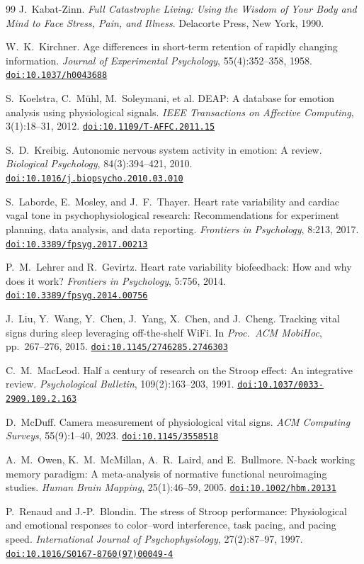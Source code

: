 \documentclass[11pt,a4paper]{article}
\newcommand{\doi}[1]{\href{https://doi.org/#1}{\nolinkurl{doi:#1}}}
\begin{document}
\begin{thebibliography}{99}
 J.~Kabat-Zinn. \emph{Full Catastrophe Living: Using the Wisdom of Your Body and Mind to Face
Stress, Pain, and Illness}. Delacorte Press, New York, 1990.

 W.~K.~Kirchner. Age differences in short-term retention of rapidly changing information.
\emph{Journal of Experimental Psychology}, 55(4):352--358, 1958. \doi{10.1037/h0043688}

 S.~Koelstra, C.~M\"uhl, M.~Soleymani, et al. DEAP: A database for emotion analysis using
physiological signals. \emph{IEEE Transactions on Affective Computing}, 3(1):18--31, 2012.
\doi{10.1109/T-AFFC.2011.15}

 S.~D.~Kreibig. Autonomic nervous system activity in emotion: A review. \emph{Biological
Psychology}, 84(3):394--421, 2010. \doi{10.1016/j.biopsycho.2010.03.010}

 S.~Laborde, E.~Mosley, and J.~F.~Thayer. Heart rate variability and cardiac vagal tone in
psychophysiological research: Recommendations for experiment planning, data analysis, and data reporting.
\emph{Frontiers in Psychology}, 8:213, 2017. \doi{10.3389/fpsyg.2017.00213}

 P.~M.~Lehrer and R.~Gevirtz. Heart rate variability biofeedback: How and why does it work?
\emph{Frontiers in Psychology}, 5:756, 2014. \doi{10.3389/fpsyg.2014.00756}

 J.~Liu, Y.~Wang, Y.~Chen, J.~Yang, X.~Chen, and J.~Cheng. Tracking vital signs during sleep
leveraging off-the-shelf WiFi. In \emph{Proc.\ ACM MobiHoc}, pp.~267--276, 2015. \doi{10.1145/2746285.2746303}

 C.~M.~MacLeod. Half a century of research on the Stroop effect: An integrative review.
\emph{Psychological Bulletin}, 109(2):163--203, 1991. \doi{10.1037/0033-2909.109.2.163}

 D.~McDuff. Camera measurement of physiological vital signs. \emph{ACM Computing Surveys},
55(9):1--40, 2023. \doi{10.1145/3558518}

 A.~M.~Owen, K.~M.~McMillan, A.~R.~Laird, and E.~Bullmore. N-back working memory paradigm: A
meta-analysis of normative functional neuroimaging studies. \emph{Human Brain Mapping}, 25(1):46--59, 2005.
\doi{10.1002/hbm.20131}

 P.~Renaud and J.-P.~Blondin. The stress of Stroop performance: Physiological and emotional
responses to color--word interference, task pacing, and pacing speed. \emph{International Journal of
Psychophysiology}, 27(2):87--97, 1997. \doi{10.1016/S0167-8760(97)00049-4}


\end{thebibliography}
\end{document}
